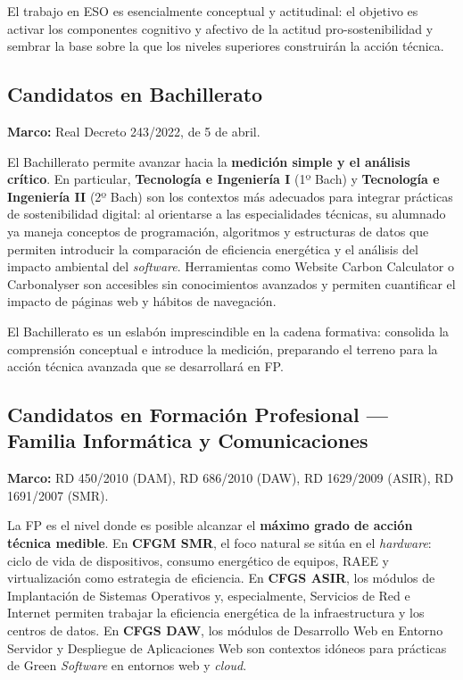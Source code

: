 El trabajo en ESO es esencialmente conceptual y actitudinal: el objetivo es activar los componentes cognitivo y afectivo de la actitud pro-sostenibilidad \cite{rosenberg1960cognitive} y sembrar la base sobre la que los niveles superiores construirán la acción técnica.


\subsection{Candidatos en Bachillerato}


\textbf{Marco:} Real Decreto 243/2022, de 5 de abril.


El Bachillerato permite avanzar hacia la \textbf{medición simple y el análisis crítico}. En particular, \textbf{Tecnología e Ingeniería I} (1º Bach) y \textbf{Tecnología e Ingeniería II} (2º Bach) son los contextos más adecuados para integrar prácticas de sostenibilidad digital: al orientarse a las especialidades técnicas, su alumnado ya maneja conceptos de programación, algoritmos y estructuras de datos que permiten introducir la comparación de eficiencia energética y el análisis del impacto ambiental del \textit{software}. Herramientas como Website Carbon Calculator o Carbonalyser son accesibles sin conocimientos avanzados y permiten cuantificar el impacto de páginas web y hábitos de navegación.


El Bachillerato es un eslabón imprescindible en la cadena formativa: consolida la comprensión conceptual e introduce la medición, preparando el terreno para la acción técnica avanzada que se desarrollará en FP.


\subsection{Candidatos en Formación Profesional — Familia Informática y Comunicaciones}


\textbf{Marco:} RD 450/2010 (DAM), RD 686/2010 (DAW), RD 1629/2009 (ASIR), RD 1691/2007 (SMR).


La FP es el nivel donde es posible alcanzar el \textbf{máximo grado de acción técnica medible}. En \textbf{CFGM SMR}, el foco natural se sitúa en el \textit{hardware}: ciclo de vida de dispositivos, consumo energético de equipos, RAEE y virtualización como estrategia de eficiencia. En \textbf{CFGS ASIR}, los módulos de Implantación de Sistemas Operativos y, especialmente, Servicios de Red e Internet permiten trabajar la eficiencia energética de la infraestructura y los centros de datos. En \textbf{CFGS DAW}, los módulos de Desarrollo Web en Entorno Servidor y Despliegue de Aplicaciones Web son contextos idóneos para prácticas de Green \textit{Software} en entornos web y \textit{cloud}.


